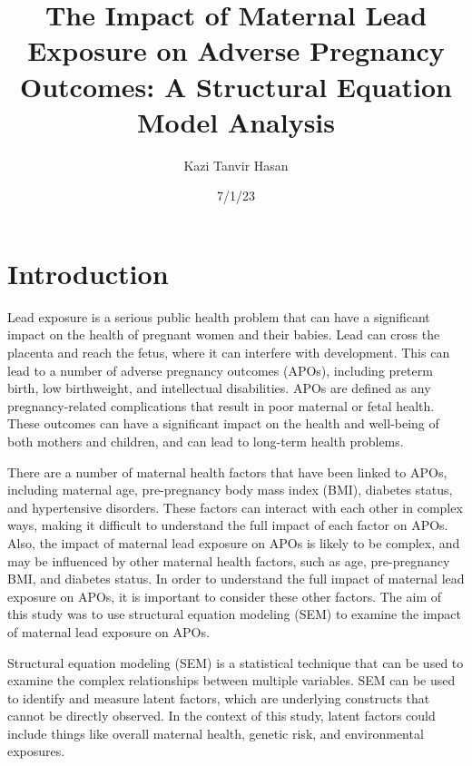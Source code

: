 \documentclass[
  letterpaper,
  DIV=11,
  numbers=noendperiod]{scrartcl}
\title{The Impact of Maternal Lead Exposure on Adverse Pregnancy
Outcomes: A Structural Equation Model Analysis}
\author{Kazi Tanvir Hasan}
\date{7/1/23}
\begin{document}
\maketitle
\ifdefined\Shaded\renewenvironment{Shaded}{\begin{tcolorbox}[boxrule=0pt, interior hidden, breakable, borderline west={3pt}{0pt}{shadecolor}, sharp corners, enhanced, frame hidden]}{\end{tcolorbox}}\fi

\hypertarget{introduction}{%
\section{Introduction}\label{introduction}}

Lead exposure is a serious public health problem that can have a
significant impact on the health of pregnant women and their babies.
Lead can cross the placenta and reach the fetus, where it can interfere
with development. This can lead to a number of adverse pregnancy
outcomes (APOs), including preterm birth, low birthweight, and
intellectual disabilities. APOs are defined as any pregnancy-related
complications that result in poor maternal or fetal health. These
outcomes can have a significant impact on the health and well-being of
both mothers and children, and can lead to long-term health problems.

There are a number of maternal health factors that have been linked to
APOs, including maternal age, pre-pregnancy body mass index (BMI),
diabetes status, and hypertensive disorders. These factors can interact
with each other in complex ways, making it difficult to understand the
full impact of each factor on APOs. Also, the impact of maternal lead
exposure on APOs is likely to be complex, and may be influenced by other
maternal health factors, such as age, pre-pregnancy BMI, and diabetes
status. In order to understand the full impact of maternal lead exposure
on APOs, it is important to consider these other factors. The aim of
this study was to use structural equation modeling (SEM) to examine the
impact of maternal lead exposure on APOs.

Structural equation modeling (SEM) is a statistical technique that can
be used to examine the complex relationships between multiple variables.
SEM can be used to identify and measure latent factors, which are
underlying constructs that cannot be directly observed. In the context
of this study, latent factors could include things like overall maternal
health, genetic risk, and environmental exposures.
\end{document}
